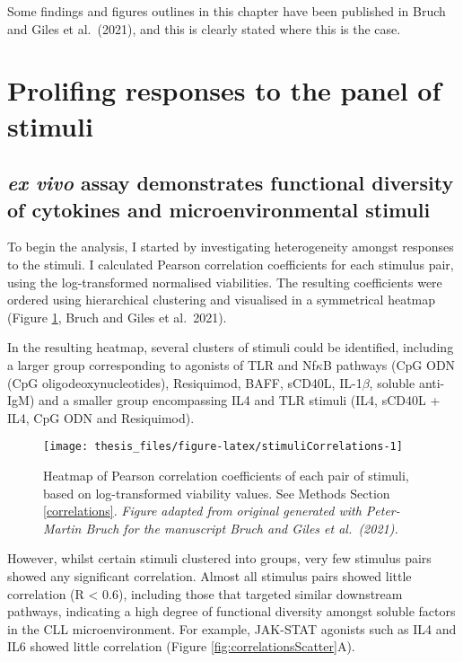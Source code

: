 \documentclass[11pt, a4paper, twosided]{book}
\begin{document}
Some findings and figures outlines in this chapter have been published in Bruch and Giles et al.~(2021), and this is clearly stated where this is the case.

\hypertarget{prolifing-responses-to-the-panel-of-stimuli}{%
\section{Prolifing responses to the panel of stimuli}\label{prolifing-responses-to-the-panel-of-stimuli}}

\hypertarget{cytokine-profiling}{%
\subsection{\texorpdfstring{\emph{ex vivo} assay demonstrates functional diversity of cytokines and microenvironmental stimuli}{ex vivo assay demonstrates functional diversity of cytokines and microenvironmental stimuli}}\label{cytokine-profiling}}

To begin the analysis, I started by investigating heterogeneity amongst responses to the stimuli. I calculated Pearson correlation coefficients for each stimulus pair, using the log-transformed normalised viabilities. The resulting coefficients were ordered using hierarchical clustering and visualised in a symmetrical heatmap (Figure \ref{fig:stimuliCorrelations}, Bruch and Giles et al.~2021).

In the resulting heatmap, several clusters of stimuli could be identified, including a larger group corresponding to agonists of TLR and Nf\(\kappa\)B pathways (CpG ODN (CpG oligodeoxynucleotides), Resiquimod, BAFF, sCD40L, IL-1\(\beta\), soluble anti-IgM) and a smaller group encompassing IL4 and TLR stimuli (IL4, sCD40L + IL4, CpG ODN and Resiquimod).


\begin{figure}

{\centering \texttt{[image: thesis\_files/figure-latex/stimuliCorrelations-1]} 

}

\caption{Heatmap of Pearson correlation coefficients of each pair of stimuli, based on log-transformed viability values. See Methods Section \ref{correlations}. \emph{Figure adapted from original generated with Peter-Martin Bruch for the manuscript Bruch and Giles et al.~(2021).}}\label{fig:stimuliCorrelations}
\end{figure}
However, whilst certain stimuli clustered into groups, very few stimulus pairs showed any significant correlation. Almost all stimulus pairs showed little correlation (R \textless{} 0.6), including those that targeted similar downstream pathways, indicating a high degree of functional diversity amongst soluble factors in the CLL microenvironment. For example, JAK-STAT agonists such as IL4 and IL6 showed little correlation (Figure \ref{fig:correlationsScatter}A).
\end{document}
